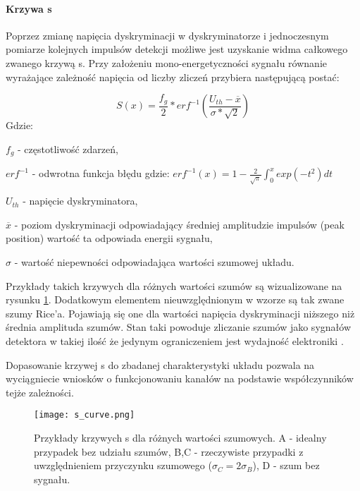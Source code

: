 \paragraph{Krzywa s}

Poprzez zmianę napięcia dyskryminacji w dyskryminatorze i jednoczesnym  pomiarze kolejnych impulsów detekcji możliwe jest uzyskanie widma całkowego zwanego krzywą s. Przy założeniu mono-energetyczności sygnału równanie wyrażające zależność napięcia od liczby zliczeń przybiera następującą postać:

\begin{equation}
        \label{wste krzywa s}
        S(x) = \frac{f_g}{2} * erf^{-1}(\frac{U_{th}-\overline{x}}{\sigma*\sqrt{2}})
\end{equation}
Gdzie:
\begin{description}
        \item $f_g$ - częstotliwość zdarzeń,
        \item $erf^{-1}$ - odwrotna funkcja błędu gdzie: $erf^{-1}(x) = 1 - \frac{2}{\sqrt{\pi}} \int^x_0 exp(-t^2)dt $
        \item $U_{th}$ - napięcie dyskryminatora,
        \item $\overline{x}$ - poziom dyskryminacji odpowiadający średniej amplitudzie impulsów (peak position) wartość ta odpowiada energii sygnału, 
        \item  $\sigma$ - wartość niepewności odpowiadająca wartości szumowej układu. 
\end{description}

Przykłady takich krzywych dla różnych wartości szumów są wizualizowane na rysunku \ref{wyk s curve wstep}. Dodatkowym elementem nieuwzględnionym w wzorze są tak zwane szumy Rice’a. Pojawiają się one dla wartości napięcia dyskryminacji niższego niż średnia amplituda szumów. Stan taki powoduje zliczanie szumów jako sygnałów detektora w takiej ilość że jedynym ograniczeniem jest wydajność elektroniki \cite{wiocek doctorat}.

Dopasowanie krzywej s do zbadanej charakterystyki układu pozwala na wyciągniecie wniosków o funkcjonowaniu kanałów na podstawie współczynników tejże zależności.   

\begin{figure}
        \centering
        \texttt{[image: s\_curve.png]}
        \caption{Przykłady krzywych s dla różnych wartości szumowych. A - idealny przypadek bez udziału szumów, B,C - rzeczywiste przypadki z uwzględnieniem przyczynku szumowego ($\sigma_C=2\sigma_B$), D - szum bez sygnału. \cite{wiocek doctorat}} 
        \label{wyk s curve wstep}
\end{figure}

